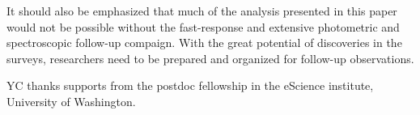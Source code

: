\documentclass[twocolumn]{aastex61}
\begin{document}
It should also be emphasized that much of the analysis presented in
this paper would not be possible without the fast-response and
extensive photometric and spectroscopic follow-up compaign. With the
great potential of discoveries in the surveys, researchers need to
be prepared and organized for follow-up observations. 

\acknowledgements

YC thanks supports from the postdoc fellowship in the eScience
institute, University of Washington.



\end{document}
